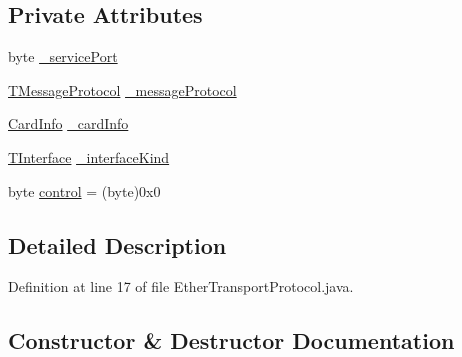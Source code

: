 \subsection*{Private Attributes}
\begin{DoxyCompactItemize}
\item 
byte \mbox{\hyperlink{classcom_1_1ethernom_1_1android_1_1etherapi_1_1_ether_transport_protocol_ab82b26050c8d0a5de91ed18dbb48e1f2}{\+\_\+service\+Port}}
\item 
\mbox{\hyperlink{enumcom_1_1ethernom_1_1android_1_1etherapi_1_1_t_message_protocol}{T\+Message\+Protocol}} \mbox{\hyperlink{classcom_1_1ethernom_1_1android_1_1etherapi_1_1_ether_transport_protocol_a885a85f94c2374f315a060ae8231d4a7}{\+\_\+message\+Protocol}}
\item 
\mbox{\hyperlink{classcom_1_1ethernom_1_1android_1_1etherapi_1_1_card_info}{Card\+Info}} \mbox{\hyperlink{classcom_1_1ethernom_1_1android_1_1etherapi_1_1_ether_transport_protocol_a8ad30f5f02ad20c0f5864edf2d3e5b88}{\+\_\+card\+Info}}
\item 
\mbox{\hyperlink{enumcom_1_1ethernom_1_1android_1_1etherapi_1_1link_layer_1_1_t_interface}{T\+Interface}} \mbox{\hyperlink{classcom_1_1ethernom_1_1android_1_1etherapi_1_1_ether_transport_protocol_a7494d65a1e0d231e53fd3a203056fe4e}{\+\_\+interface\+Kind}}
\item 
byte \mbox{\hyperlink{classcom_1_1ethernom_1_1android_1_1etherapi_1_1_ether_transport_protocol_a7c532159826a65673c85b5acb14b2daf}{control}} = (byte)0x0
\end{DoxyCompactItemize}


\subsection{Detailed Description}


Definition at line 17 of file Ether\+Transport\+Protocol.\+java.



\subsection{Constructor \& Destructor Documentation}
\mbox{\label{classcom_1_1ethernom_1_1android_1_1etherapi_1_1_ether_transport_protocol_a3827df3e5ace99c3a818a57c1bba6207}} 
